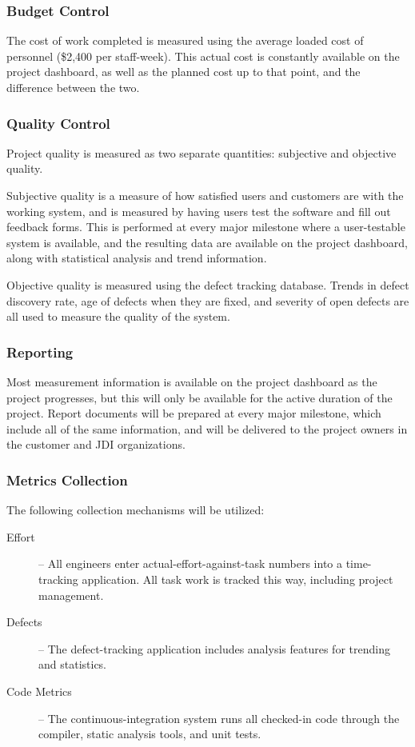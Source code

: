 \documentclass[11pt]{article}
\newcommand{\loadedcost}{\$2,400 per staff-week}
\begin{document}
\subsubsection{Budget Control}
The cost of work completed is measured using the average loaded cost of personnel (\loadedcost).
This actual cost is constantly available on the project dashboard, as well as the planned cost up to
that point, and the difference between the two.  


\subsubsection{Quality Control}
Project quality is measured as two separate quantities: subjective and objective quality.

Subjective quality is a measure of how satisfied users and customers are with the working system,
and is measured by having users test the software and fill out feedback forms.  This is performed at
every major milestone where a user-testable system is available, and the resulting data are
available on the project dashboard, along with statistical analysis and trend information.

Objective quality is measured using the defect tracking database.  Trends in defect discovery rate,
age of defects when they are fixed, and severity of open defects are all used to measure the quality
of the system.
  
\subsubsection{Reporting}
Most measurement information is available on the project dashboard as the project progresses, but
this will only be available for the active duration of the project.  Report documents will be
prepared at every major milestone, which include all of the same information, and will be delivered
to the project owners in the customer and JDI organizations.

\subsubsection{Metrics Collection}
The following collection mechanisms will be utilized:
\begin{description}
\item[Effort] -- All engineers enter actual-effort-against-task numbers into a time-tracking
  application.  All task work is tracked this way, including project management.
\item[Defects] -- The defect-tracking application includes analysis features for trending and
  statistics.
\item[Code Metrics] -- The continuous-integration system runs all checked-in code through the
  compiler, static analysis tools, and unit tests.
\end{description}
\end{document}
